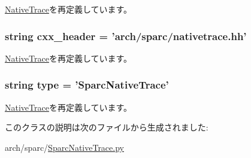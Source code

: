 \hyperlink{classNativeTrace_1_1NativeTrace_a58cd55cd4023648e138237cfc0822ae3}{NativeTrace}を再定義しています。\hypertarget{classSparcNativeTrace_1_1SparcNativeTrace_a17da7064bc5c518791f0c891eff05fda}{
\subsubsection[{cxx\_\-header}]{\setlength{\rightskip}{0pt plus 5cm}string {\bf cxx\_\-header} = 'arch/sparc/nativetrace.hh'}}
\label{classSparcNativeTrace_1_1SparcNativeTrace_a17da7064bc5c518791f0c891eff05fda}


\hyperlink{classNativeTrace_1_1NativeTrace_a17da7064bc5c518791f0c891eff05fda}{NativeTrace}を再定義しています。\hypertarget{classSparcNativeTrace_1_1SparcNativeTrace_acce15679d830831b0bbe8ebc2a60b2ca}{
\subsubsection[{type}]{\setlength{\rightskip}{0pt plus 5cm}string {\bf type} = '{\bf SparcNativeTrace}'}}
\label{classSparcNativeTrace_1_1SparcNativeTrace_acce15679d830831b0bbe8ebc2a60b2ca}


\hyperlink{classNativeTrace_1_1NativeTrace_acce15679d830831b0bbe8ebc2a60b2ca}{NativeTrace}を再定義しています。

このクラスの説明は次のファイルから生成されました:\begin{DoxyCompactItemize}
\item 
arch/sparc/\hyperlink{SparcNativeTrace_8py}{SparcNativeTrace.py}\end{DoxyCompactItemize}
